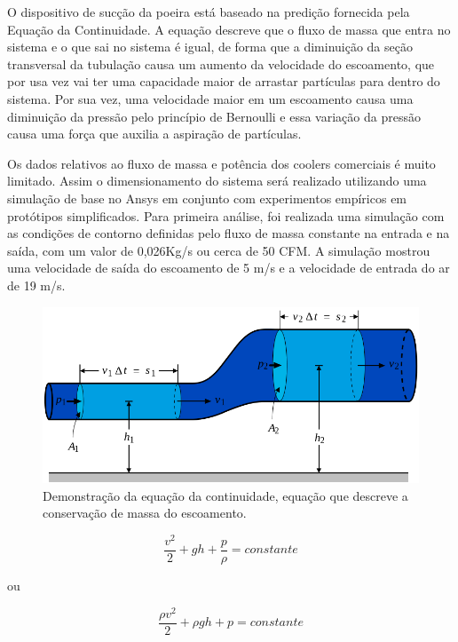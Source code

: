 		O dispositivo de sucção da poeira está baseado na predição fornecida pela Equação da Continuidade. A equação descreve que o fluxo de massa que entra no sistema e o que sai no sistema é igual, de forma que a diminuição da seção transversal da tubulação causa um aumento da velocidade do escoamento, que por usa vez vai ter uma capacidade maior de arrastar partículas para dentro do sistema. Por sua vez, uma velocidade maior em um escoamento causa uma diminuição da pressão pelo princípio de Bernoulli e essa variação da pressão causa uma força que auxilia a aspiração de partículas.

		Os dados relativos ao fluxo de massa e potência dos coolers comerciais é muito limitado. Assim o dimensionamento do sistema será realizado utilizando uma simulação de base no Ansys em conjunto com experimentos empíricos em protótipos simplificados. Para primeira análise, foi realizada uma simulação com as condições de contorno definidas pelo fluxo de massa constante na entrada e na saída, com um valor de 0,026Kg/s ou  cerca de 50 CFM. A simulação mostrou uma velocidade de saída do escoamento de 5 m/s e a velocidade de entrada do ar de 19 m/s.

		\begin{figure}[H]
			\centering
			\includegraphics[scale=0.4]{figuras/succao.png}
			\caption{Demonstração da equação da continuidade, equação que descreve a conservação de massa do escoamento.}
			\label{img:succao}
		\end{figure}

		\begin{equation}\label{1}
		\frac{v^{2}}{2} + gh + \frac{p}{\rho} = constante
		\end{equation}
		
		ou
		
		\begin{equation}
		\frac{\rho v^{2}}{2} + \rho gh + p = constante
		\end{equation}

